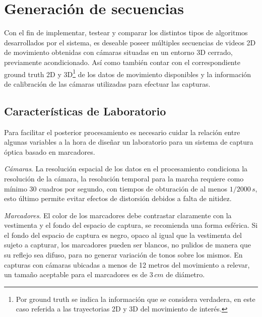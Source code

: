 \section{Generación de secuencias} 
\label{section_base_de_datos}
Con el fin de implementar, testear y comparar los distintos tipos de algoritmos desarrollados por el sistema, es deseable poseer  múltiples secuencias de videos 2D de movimiento obtenidas
con cámaras situadas en un entorno 3D cerrado, previamente acondicionado. Así como también contar con el correspondiente ground truth 2D y 3D\footnote{Por ground truth se indica la información que se considera verdadera, en este caso referida a las trayectorias 2D y 3D del movimiento de interés.} de los datos de movimiento disponibles y la información de calibración de las cámaras utilizadas para efectuar las capturas.
\vspace{-0.3cm} 
\subsection{Características de Laboratorio}
\label{seccion_Caracteristicas_Laboratorio}
Para facilitar el posterior procesamiento es necesario cuidar la relación entre algunas variables a la hora de diseñar un laboratorio para un sistema de captura óptica basado en marcadores.
%

\textit{Cámaras}. La resolución espacial de los datos en el procesamiento condiciona la resolución de la cámara, la resolución temporal para la marcha requiere como mínimo 30 cuadros por segundo, con tiempos de obturación de al menos $1/2000\, s$, esto último permite evitar efectos de distorsión debidos a falta de nitidez.


\textit{Marcadores}. El color de los  marcadores debe contrastar claramente con la vestimenta y el fondo del espacio de captura, se recomienda una forma esférica. Si el fondo del espacio de captura es negro, opaco al igual que la vestimenta del sujeto a capturar, los marcadores pueden ser blancos, no pulidos de manera que su reflejo sea difuso, para no generar variación de tonos sobre los mismos. En capturas con cámaras ubicadas a menos de 12 metros del movimiento a relevar, un tamaño aceptable para el marcadores es de $3\,cm$ de diámetro.


